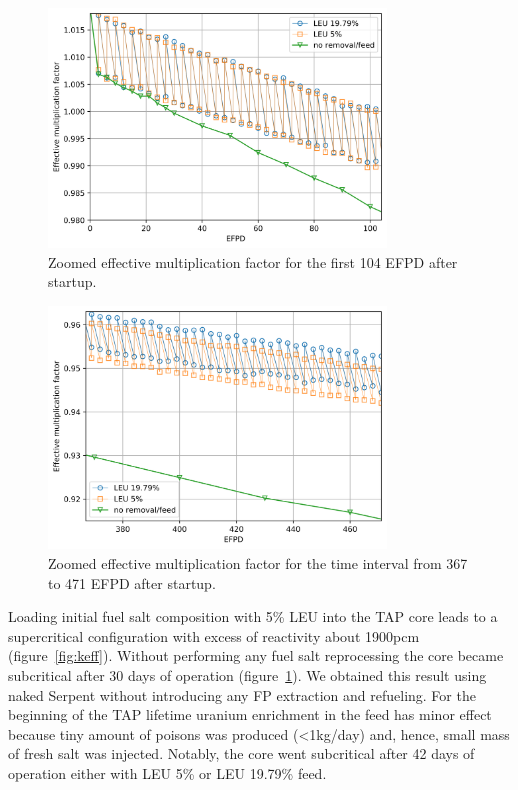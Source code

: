 \documentclass[12pt]{article} %
\begin{document}
\begin{figure}[htp!] %
  \centering
		  \includegraphics[width=0.8\textwidth]{keff_zoomed_1.png}
	  \vspace{-0.2in}
  \caption{Zoomed effective multiplication factor for the first 104 EFPD 
  after startup.}
  \label{fig:keff-zoomed}
\end{figure}
\begin{figure}[htp!] %
  \centering
		  \includegraphics[width=0.8\textwidth]{keff_zoomed_2.png}
	 \vspace{-0.2in}
  \caption{Zoomed effective multiplication factor for the time interval 
  from 367 to 471 EFPD after startup.}
  \label{fig:keff-zoomed-2}
\end{figure}

Loading initial fuel salt composition with 5\% \gls{LEU} into the \gls{TAP} 
core leads to a supercritical configuration with excess of reactivity about 
1900pcm (figure~\ref{fig:keff}). Without performing any fuel salt reprocessing 
the core became subcritical after 30 days of operation (figure~\ref{fig:keff-zoomed}). 
We obtained this result using naked Serpent without introducing any \gls{FP} extraction 
and refueling. For the beginning of the \gls{TAP} lifetime uranium enrichment in the 
feed has minor effect because tiny amount of poisons was produced (<1kg/day) and, 
hence, small mass of fresh salt was injected. Notably, the core went subcritical after 
42 days of operation either with \gls{LEU} 5\% or \gls{LEU} 19.79\% feed.
\end{document}

